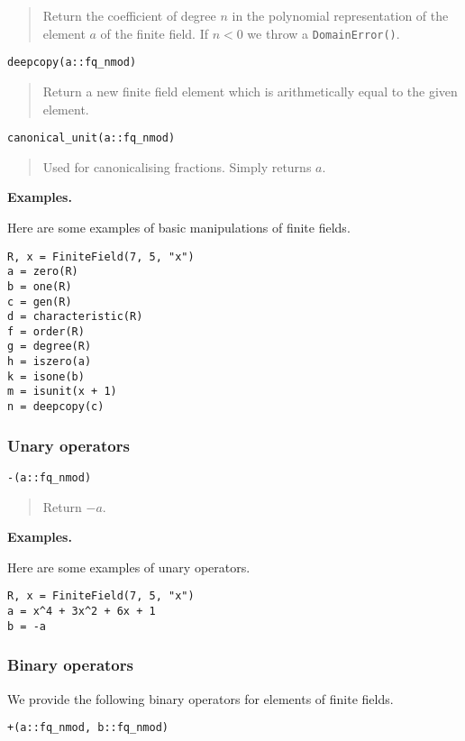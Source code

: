 \documentclass[a4paper,10pt]{article}
\newcommand{\code}{\lstinline}
\newcommand{\desc}[1]{\vspace{-3mm}\begin{quote}#1\end{quote}}
\begin{document}
{{\desc{Return the coefficient of degree $n$ in the polynomial representation
of the element $a$ of the finite field. If $n < 0$ we throw a
\code{DomainError()}.}

\begin{lstlisting}
deepcopy(a::fq_nmod)
\end{lstlisting}

\desc{Return a new finite field element which is arithmetically equal to
the given element.}

\begin{lstlisting}
canonical_unit(a::fq_nmod)
\end{lstlisting}

\desc{Used for canonicalising fractions. Simply returns $a$.}

\textbf{Examples.}

Here are some examples of basic manipulations of finite fields.

\begin{lstlisting}
R, x = FiniteField(7, 5, "x")
a = zero(R)
b = one(R)
c = gen(R)
d = characteristic(R)
f = order(R)
g = degree(R)
h = iszero(a)
k = isone(b)
m = isunit(x + 1)
n = deepcopy(c)
\end{lstlisting}

\subsubsection{Unary operators}

\begin{lstlisting}
-(a::fq_nmod)
\end{lstlisting}

\desc{Return $-a$.}

\textbf{Examples.}

Here are some examples of unary operators.

\begin{lstlisting}
R, x = FiniteField(7, 5, "x")
a = x^4 + 3x^2 + 6x + 1
b = -a
\end{lstlisting}

\subsubsection{Binary operators}

We provide the following binary operators for elements of
finite fields.

\begin{lstlisting}
+(a::fq_nmod, b::fq_nmod)
\end{lstlisting}

}}
\end{document}
